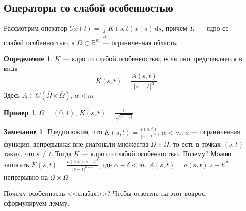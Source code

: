 \documentclass[11pt,openany,a4paper]{scrartcl}
\theoremstyle{plain}
\theoremstyle{definition}
\newtheorem{definition}[theorem]{Определение}
\newtheorem{remark}[theorem]{Замечание}
\newtheorem{example}[theorem]{Пример}
\newcommand\mb{\mathbb}
\newcommand\real{\mb R}
\newcommand{\dif}{\, \mathrm d}
\begin{document}
\subsection{Операторы со слабой особенностью}

Рассмотрим оператор $Ux(t) = \int\limits_\Omega K(s, t) x(s) \dif s$, причём $K$ —
ядро со слабой особенностью, а $\Omega \subset \real^m$ — ограниченная область.

\begin{definition}
    $K$ — ядро со слабой особенностью, если оно представляется в виде:
    $$
    K(s, t) = \frac{A(s, t)}{|s - t|^\alpha}
    $$
    Здесь $A \in C(\overline\Omega \times \overline\Omega)$, $\alpha < m$
\end{definition}
\begin{example}
    $\Omega = (0, 1)$, $K(s, t) = \frac{1}{\sqrt{|s - t|}}$
\end{example}
\begin{remark}
    Предположим, что $K(s, t) = \frac{a(s, t)}{|s - t|^\alpha}$, $\alpha < m$,
    $a$ — ограниченная функция, непрерывная вне диагонали множества
    $\overline\Omega \times \overline\Omega$, то есть в точках $(s, t)$ таких,
    что $s \neq t$. Тогда $K$ — ядро со слабой особенностью. Почему? Можно
    записать $K(s, t) = \frac{a(s, t)|s-t|^\delta}{|s-t|^{\alpha + \delta}}$, где
    $\alpha + \delta < m$. $A(s, t) = a(s, t)|s-t|^\delta$ непрерывно на
    $\overline\Omega \times \overline\Omega$
\end{remark}

Почему особенность <<слабая>>? Чтобы ответить на этот вопрос, сформулируем лемму.
\end{document}
